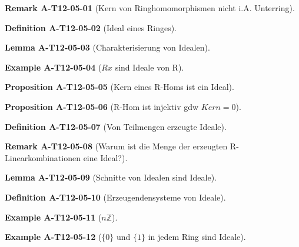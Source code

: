 \documentclass[10pt, letterpaper]{article}
\newcommand{\Z}{\mathbb{Z}}
\newcommand{\CustomHeading}[3]{%
  \par\medskip\noindent%
  \textbf{#1 #2} \textnormal{(#3)}.\enskip%
}
\newenvironment{DEF}[2]{\CustomHeading{Definition}{#1}{#2}}{}
\newenvironment{PROP}[2]{\CustomHeading{Proposition}{#1}{#2}}{}
\newenvironment{LEM}[2]{\CustomHeading{Lemma}{#1}{#2}}{}
\newenvironment{REM}[2]{\CustomHeading{Remark}{#1}{#2}}{}
\newenvironment{EXA}[2]{\CustomHeading{Example}{#1}{#2}}{}
\begin{document}
\begin{REM}{A-T12-05-01}{Kern von Ringhomomorphismen nicht i.A. Unterring}
\end{REM}

\begin{DEF}{A-T12-05-02}{Ideal eines Ringes}
\end{DEF}

\begin{LEM}{A-T12-05-03}{Charakterisierung von Idealen}
\end{LEM}

\begin{EXA}{A-T12-05-04}{$Rx$ sind Ideale von R}
\end{EXA}

\begin{PROP}{A-T12-05-05}{Kern eines R-Homs ist ein Ideal}
\end{PROP}

\begin{PROP}{A-T12-05-06}{R-Hom ist injektiv gdw $Kern = 0$}
\end{PROP}

\begin{DEF}{A-T12-05-07}{Von Teilmengen erzeugte Ideale}
\end{DEF}

\begin{REM}{A-T12-05-08}{Warum ist die Menge der erzeugten R-Linearkombinationen eine Ideal?}
\end{REM}

\begin{LEM}{A-T12-05-09}{Schnitte von Idealen sind Ideale}
\end{LEM}

\begin{DEF}{A-T12-05-10}{Erzeugendensysteme von Ideale}
\end{DEF}

\begin{EXA}{A-T12-05-11}{$n\Z$}
\end{EXA}

\begin{EXA}{A-T12-05-12}{$\{0\}$ und $\{1\}$ in jedem Ring sind Ideale}
\end{EXA}
\end{document}
